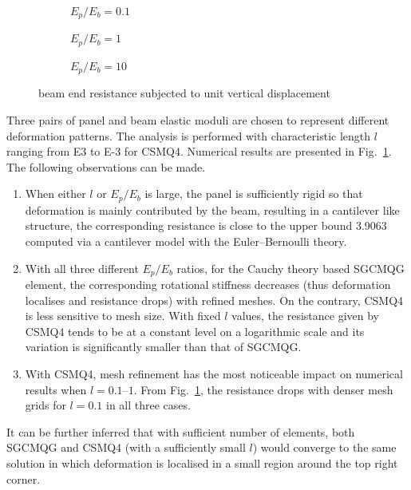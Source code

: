 \documentclass[3p,sort&compress,11pt,fleqn,review]{elsarticle}
\newcommand*{\figref}[1]{Fig.~\ref{#1}}
\begin{document}
\begin{figure}[ht]
\centering\footnotesize
\begin{subfigure}[b]{.99\textwidth}\centering

\caption{$E_p/E_b=0.1$}
\end{subfigure}
\begin{subfigure}[b]{.99\textwidth}\centering

\caption{$E_p/E_b=1$}
\end{subfigure}
\begin{subfigure}[b]{.99\textwidth}\centering

\caption{$E_p/E_b=10$}
\end{subfigure}
\caption{beam end resistance subjected to unit vertical displacement}\label{fig:joint}
\end{figure}
Three pairs of panel and beam elastic moduli are chosen to represent different deformation patterns. The analysis is performed with characteristic length $l$ ranging from \num[print-unity-mantissa=false]{E3} to \num[print-unity-mantissa=false]{E-3} for CSMQ4. Numerical results are presented in \figref{fig:joint}. The following observations can be made.
\begin{enumerate}
\item When either $l$ or $E_p/E_b$ is large, the panel is sufficiently rigid so that deformation is mainly contributed by the beam, resulting in a cantilever like structure, the corresponding resistance is close to the upper bound \num{3.9063} computed via a cantilever model with the Euler--Bernoulli theory.
\item With all three different $E_p/E_b$ ratios, for the Cauchy theory based SGCMQG element, the corresponding rotational stiffness decreases (thus deformation localises and resistance drops) with refined meshes. On the contrary, CSMQ4 is less sensitive to mesh size. With fixed $l$ values, the resistance given by CSMQ4 tends to be at a constant level on a logarithmic scale and its variation is significantly smaller than that of SGCMQG.
\item With CSMQ4, mesh refinement has the most noticeable impact on numerical results when $l=\numrange{0.1}{1}$. From \figref{fig:joint}, the resistance drops with denser mesh grids for $l=0.1$ in all three cases.
\end{enumerate}

It can be further inferred that with sufficient number of elements, both SGCMQG and CSMQ4 (with a sufficiently small $l$) would converge to the same solution in which deformation is localised in a small region around the top right corner.
\end{document}
